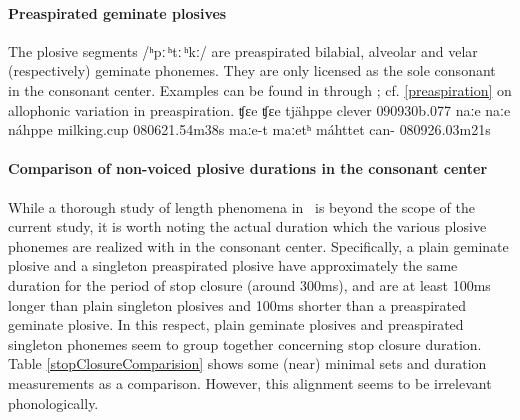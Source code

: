 \paragraph{Preaspirated geminate plosives}
The plosive segments \mbox{/ʰpː\,ʰtː\,ʰkː/} are preaspirated bilabial, alveolar and velar (respectively) geminate phonemes. 
They are only licensed as the sole consonant in the consonant center.  
Examples can be found in  through ; cf. \SEC\ref{preaspiration} on allophonic variation in preaspiration. 
		{ʧɛe}		{ʧɛe}		{tjähppe}	{clever\BS{}}		{090930b}{.077}
	{naːe}	{naːe}	{náhppe}	{milking.cup\BS{}}	{080621}{.54m38s}
			{maːe-t}	{maːetʰ}	{máhttet}	{can-}			{080926}{.03m21s}


\paragraph[Non-voiced plosive durations in the consonant center]{Comparison of non-voiced plosive durations in the consonant center}\label{plosiveDurationComparison}
While a thorough study of length phenomena in \PS\ is beyond the scope of the current study, it is worth noting the actual duration which the various plosive phonemes are realized with in the consonant center. %
Specifically, %
a plain geminate plosive and a singleton preaspirated plosive have approximately the same duration for the period of stop closure (around 300ms), and are at least 100ms longer than plain singleton plosives and 100ms shorter than a preaspirated geminate plosive. In this respect, plain geminate plosives and preaspirated singleton phonemes seem to group together concerning stop closure duration. 
Table \vref{stopClosureComparision} %
shows some (near) minimal sets and duration measurements as a comparison. However, this alignment seems to be irrelevant phonologically. 

